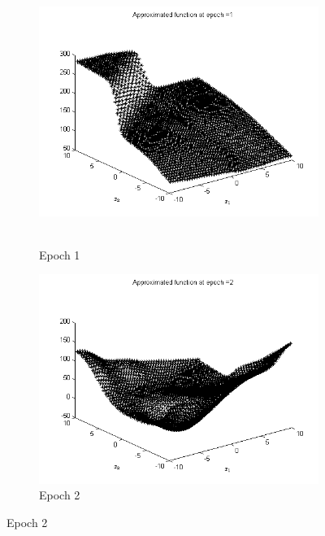\begin{figure}
\begin{subfigure}{.5\textwidth}
  \centering
  \includegraphics[width=.8\linewidth]{Regression/bivariate/1layer_epoch_1.png}\
  \caption{Epoch 1}
\end{subfigure}%
\begin{subfigure}{.5\textwidth}
  \centering
  \includegraphics[width=.8\linewidth]{Regression/bivariate/1layer_epoch_2.png}
   \caption{Epoch 2}
  \end{subfigure}
  

\end{figure}

